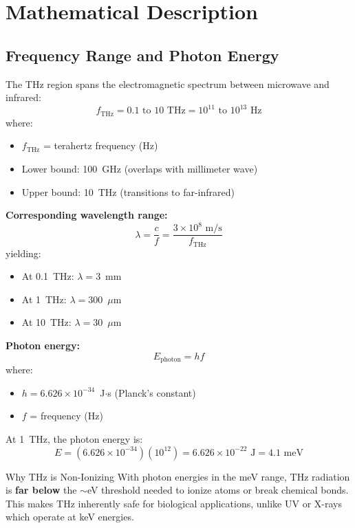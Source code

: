\section{Mathematical Description}

\subsection{Frequency Range and Photon Energy}

The THz region spans the electromagnetic spectrum between microwave and infrared:
\begin{equation}
f_{\text{THz}} = 0.1 \text{ to } 10 \text{ THz} = 10^{11} \text{ to } 10^{13} \text{ Hz}
\end{equation}
where:
\begin{itemize}
\item $f_{\text{THz}}$ = terahertz frequency (Hz)
\item Lower bound: 100~GHz (overlaps with millimeter wave)
\item Upper bound: 10~THz (transitions to far-infrared)
\end{itemize}

\textbf{Corresponding wavelength range:}
\begin{equation}
\lambda = \frac{c}{f} = \frac{3 \times 10^8 \text{ m/s}}{f_{\text{THz}}}
\end{equation}
yielding:
\begin{itemize}
\item At 0.1~THz: $\lambda = 3$~mm
\item At 1~THz: $\lambda = 300$~$\mu$m
\item At 10~THz: $\lambda = 30$~$\mu$m
\end{itemize}

\textbf{Photon energy:}
\begin{equation}
E_{\text{photon}} = hf
\end{equation}
where:
\begin{itemize}
\item $h = 6.626 \times 10^{-34}$~J$\cdot$s (Planck's constant)
\item $f$ = frequency (Hz)
\end{itemize}

At 1~THz, the photon energy is:
\begin{equation}
E = (6.626 \times 10^{-34})(10^{12}) = 6.626 \times 10^{-22} \text{ J} = 4.1 \text{ meV}
\end{equation}

\begin{calloutbox}{Why THz is Non-Ionizing}
With photon energies in the meV range, THz radiation is \textbf{far below} the $\sim$eV threshold needed to ionize atoms or break chemical bonds. This makes THz inherently safe for biological applications, unlike UV or X-rays which operate at keV energies.
\end{calloutbox}

